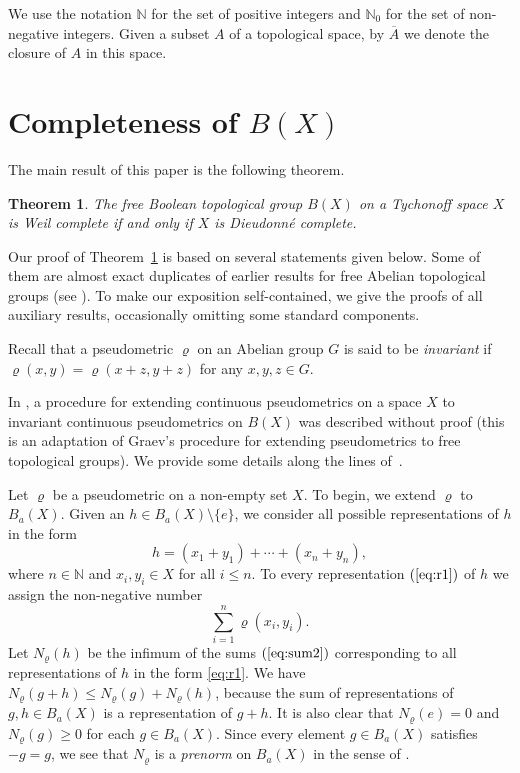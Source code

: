 \documentclass[a4paper,12pt]{amsart}
\newtheorem{theorem}{Theorem}[section]
\theoremstyle{definition}
\begin{document}
We use the notation $\mathbb N$ for the set of positive integers and $\mathbb 
N_0$ for the set of non-negative integers. Given a subset $A$ of a 
topological space, by $\overline A$ we denote the closure of $A$ in this space.


\section{Completeness of $B(X)$}\label{Sec:2}

The main result of this paper is the following theorem.
 
\begin{theorem}\label{Th:Main}
The free Boolean topological group $B(X)$ on a Tychonoff 
space $X$ is Weil complete if and only if $X$ is Dieudonn\'e 
complete.
\end{theorem}

Our proof of Theorem~\ref{Th:Main} is based on 
several statements given below. Some of them are almost exact duplicates of 
earlier results for free Abelian topological groups (see 
\cite[Section~7.2]{AT}). To make our exposition self-contained, we give the 
proofs of all auxiliary results, occasionally omitting some standard 
components.

Recall that a pseudometric $\varrho$ on an Abelian group $G$ is said to be 
\emph{invariant} if $\varrho(x, y)= \varrho(x+z, y+z)$ for any $x, y, z\in G$. 

In \cite[p.~498]{Sip}, a procedure for extending continuous pseudometrics on 
a space $X$ to invariant continuous pseudometrics on $B(X)$ was described 
without proof (this is an adaptation of Graev's procedure for extending 
pseudometrics to free topological groups). We provide some details along the 
lines of~\cite{Sip}. 

Let $\varrho$ be a pseudometric on a non-empty set $X$. To begin, we extend 
$\varrho$ to $B_a(X)$. Given an $h\in B_a(X)\setminus \{e\}$, we consider all 
possible representations of $h$ in the form 
\begin{equation} 
\label{eq:r1} 
h= (x_1+y_1)+\cdots+(x_n+y_n), 
\end{equation} 
where $n\in \mathbb N$ and $x_i,y_i\in X$ for all $i\leq n$. To every 
representation $(\ref{eq:r1})$ of $h$ we assign the non-negative number 
\begin{equation}
\label{eq:sum2}
\sum_{i=1}^n \varrho(x_i,y_i). 
\end{equation} 
Let $N_\varrho(h)$ be the infimum of the sums $(\ref{eq:sum2})$ corresponding 
to all representations of $h$ in the form \eqref{eq:r1}. We have 
$N_\varrho(g+h)\leq N_\varrho(g) + N_\varrho(h)$, because the sum of 
representations of $g,h\in B_a(X)$ is a representation of $g+h$. It is also 
clear that $N_\varrho(e)=0$ and $N_\varrho(g)\geq 0$ for each $g\in B_a(X)$. 
Since every element $g\in B_a(X)$ satisfies $-g=g$, we see that $N_\varrho$ is 
a \emph{prenorm} on $B_a(X)$ in the sense of \cite[Section~3.3]{AT}. 
\end{document}
